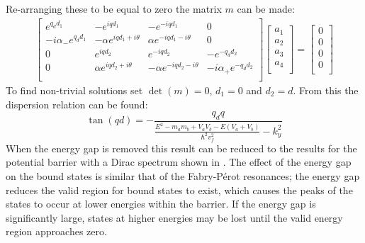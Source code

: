 				Re-arranging these to be equal to zero the matrix $m$ can be made:
				\begin{align}
					\left[\begin{array}{cccc}
						e^{q_{d}d_{1}}&-e^{iqd_{1}}&-e^{-iqd_{1}}&0\\
						-i\alpha_{-}e^{q_{d}d_{1}}&-\alpha e^{iqd_{1}+i\theta}&\alpha e^{-iqd_{1}-i\theta}&0\\
						0&e^{iqd_{2}}&e^{-iqd_{2}}&-e^{-q_{d}d_{2}}\\
						0&\alpha e^{iqd_{2}+i\theta}&-\alpha e^{-iqd_{2}-i\theta}&-i\alpha_{+}e^{-q_{d}d_{2}}\\
					\end{array}\right]
					\left[\begin{array}{cccc}
						a_{1}\\
						a_{2}\\
						a_{3}\\
						a_{4}\\
					\end{array}\right]=
					\left[\begin{array}{cccc}
						0\\
						0\\
						0\\
						0\\
					\end{array}\right]
				\end{align}
				To find non-trivial solutions set $\det(m)=0$, $d_{1}=0$ and $d_{2}=d$. From this the dispersion relation can be found:
				\begin{equation}
					\tan(qd)=-\frac{q_{d}q}{\frac{E^{2}-m_{a}m_{b}+V_{a}V_{b}-E\left(V_{a}+V_{b}\right)}{\hbar^{2}v_{f}^{2}}-k_{y}^{2}}
					\label{boundstates}
				\end{equation}
				When the energy gap is removed this result can be reduced to the results for the potential barrier with a Dirac spectrum shown in \cite{b3}. The effect of the energy gap on the bound states is similar that of the Fabry-P\'{e}rot resonances; the energy gap reduces the valid region for bound states to exist, which causes the peaks of the states to occur at lower energies within the barrier. If the energy gap is significantly large, states at higher energies may be lost until the valid energy region approaches zero.
